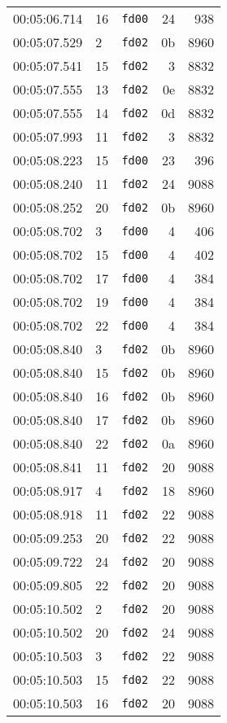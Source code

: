 \documentclass{article}
\begin{document}
\begin{longtable}{lllrr}
00:05:06.714 & 16 & \texttt{fd00} & 24 & 938 \\
00:05:07.529 & 2 & \texttt{fd02} & 0b & 8960 \\
00:05:07.541 & 15 & \texttt{fd02} & 3 & 8832 \\
00:05:07.555 & 13 & \texttt{fd02} & 0e & 8832 \\
00:05:07.555 & 14 & \texttt{fd02} & 0d & 8832 \\
00:05:07.993 & 11 & \texttt{fd02} & 3 & 8832 \\
00:05:08.223 & 15 & \texttt{fd00} & 23 & 396 \\
00:05:08.240 & 11 & \texttt{fd02} & 24 & 9088 \\
00:05:08.252 & 20 & \texttt{fd02} & 0b & 8960 \\
00:05:08.702 & 3 & \texttt{fd00} & 4 & 406 \\
00:05:08.702 & 15 & \texttt{fd00} & 4 & 402 \\
00:05:08.702 & 17 & \texttt{fd00} & 4 & 384 \\
00:05:08.702 & 19 & \texttt{fd00} & 4 & 384 \\
00:05:08.702 & 22 & \texttt{fd00} & 4 & 384 \\
00:05:08.840 & 3 & \texttt{fd02} & 0b & 8960 \\
00:05:08.840 & 15 & \texttt{fd02} & 0b & 8960 \\
00:05:08.840 & 16 & \texttt{fd02} & 0b & 8960 \\
00:05:08.840 & 17 & \texttt{fd02} & 0b & 8960 \\
00:05:08.840 & 22 & \texttt{fd02} & 0a & 8960 \\
00:05:08.841 & 11 & \texttt{fd02} & 20 & 9088 \\
00:05:08.917 & 4 & \texttt{fd02} & 18 & 8960 \\
00:05:08.918 & 11 & \texttt{fd02} & 22 & 9088 \\
00:05:09.253 & 20 & \texttt{fd02} & 22 & 9088 \\
00:05:09.722 & 24 & \texttt{fd02} & 20 & 9088 \\
00:05:09.805 & 22 & \texttt{fd02} & 20 & 9088 \\
00:05:10.502 & 2 & \texttt{fd02} & 20 & 9088 \\
00:05:10.502 & 20 & \texttt{fd02} & 24 & 9088 \\
00:05:10.503 & 3 & \texttt{fd02} & 22 & 9088 \\
00:05:10.503 & 15 & \texttt{fd02} & 22 & 9088 \\
00:05:10.503 & 16 & \texttt{fd02} & 20 & 9088 \\

\end{longtable}
\end{document}
